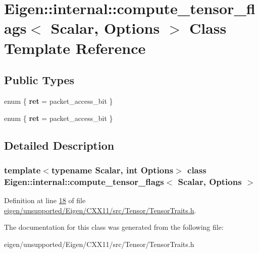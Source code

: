 \hypertarget{class_eigen_1_1internal_1_1compute__tensor__flags}{}\section{Eigen\+:\+:internal\+:\+:compute\+\_\+tensor\+\_\+flags$<$ Scalar, Options $>$ Class Template Reference}
\label{class_eigen_1_1internal_1_1compute__tensor__flags}
\subsection*{Public Types}
\begin{DoxyCompactItemize}
\item 
\mbox{\label{class_eigen_1_1internal_1_1compute__tensor__flags_aac68318d69f9e694c53d29650bf7322a}} 
enum \{ {\bfseries ret} = packet\+\_\+access\+\_\+bit
 \}
\item 
\mbox{\label{class_eigen_1_1internal_1_1compute__tensor__flags_aadb6211016384fb3034188a5ab66420e}} 
enum \{ {\bfseries ret} = packet\+\_\+access\+\_\+bit
 \}
\end{DoxyCompactItemize}


\subsection{Detailed Description}
\subsubsection*{template$<$typename Scalar, int Options$>$\newline
class Eigen\+::internal\+::compute\+\_\+tensor\+\_\+flags$<$ Scalar, Options $>$}



Definition at line \hyperlink{eigen_2unsupported_2_eigen_2_c_x_x11_2src_2_tensor_2_tensor_traits_8h_source_l00018}{18} of file \hyperlink{eigen_2unsupported_2_eigen_2_c_x_x11_2src_2_tensor_2_tensor_traits_8h_source}{eigen/unsupported/\+Eigen/\+C\+X\+X11/src/\+Tensor/\+Tensor\+Traits.\+h}.



The documentation for this class was generated from the following file\+:\begin{DoxyCompactItemize}
\item 
eigen/unsupported/\+Eigen/\+C\+X\+X11/src/\+Tensor/\+Tensor\+Traits.\+h\end{DoxyCompactItemize}
